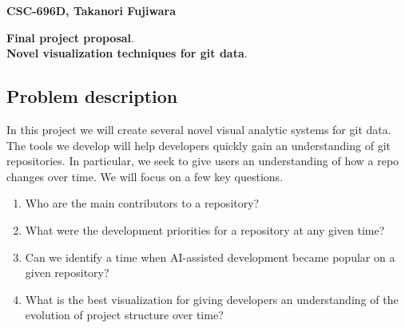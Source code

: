 \documentclass[12 pt]{article}
\begin{document}
\noindent \textbf{CSC-696D, Takanori Fujiwara} \par
\noindent \textbf{Final project proposal}. \\
\noindent \textbf{Novel visualization techniques for git data}.
\bigskip
\subsection{Problem description}
In this project we will create several novel visual analytic systems for git
data. The tools we develop will help developers quickly gain an understanding of
git repositories. In particular, we seek to give users an understanding of how a
repo changes over time. We will focus on a few key questions.
\begin{enumerate}
    \item Who are the main contributors to a repository?
    \item What were the development priorities for a repository at any given
        time?
    \item Can we identify a time when AI-assisted development became popular on
        a given repository?
    \item What is the best visualization for giving developers an understanding of the
        evolution of project structure over time?
\end{enumerate}
\end{document}
